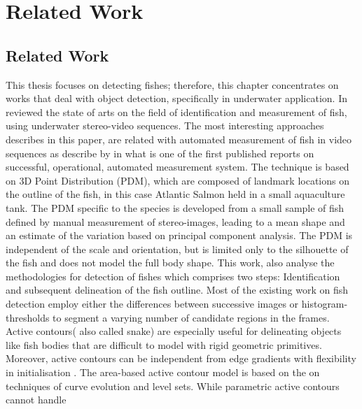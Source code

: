 \chapter{Related Work}
\label{chapter:Related Work}



 
\section{Related Work}
This thesis focuses on detecting fishes; therefore, this chapter concentrates on
works that deal with object detection, specifically in underwater application.
In \citet{Shortis2013} reviewed the state of arts on the field of identification 
and measurement of fish, using underwater stereo-video sequences. The most interesting 
approaches describes in this paper, are related with automated measurement of fish 
in video sequences as describe by \citet{Tillett2000} in what is one of the first 
published reports on successful, operational, automated measurement system. The 
technique is based on 3D Point Distribution (PDM), which are composed of landmark 
locations on the outline of the fish, in this case Atlantic Salmon held in a small 
aquaculture tank. The PDM specific to the species is developed from a small sample 
of fish defined by manual measurement of stereo-images, leading to a mean shape 
and an estimate of the variation based on principal component analysis. The PDM 
is independent of the scale and orientation, but is limited only to the silhouette 
of the fish and does not model the full body shape.
This work, also analyse the methodologies for detection of fishes which comprises
two steps: Identification and subsequent delineation of the fish outline. Most of the
existing work on fish detection employ either the differences between successive 
images \citet{Spampinato2008,Tillett2000} or histogram-thresholds to segment a 
varying number of candidate regions in the frames. Active contours( also called snake)
are especially useful for delineating objects like fish bodies that are difficult to 
model with rigid geometric primitives. Moreover, active contours can be independent 
from edge gradients with flexibility in initialisation \citet{Chan2001}. 
The area-based active contour model \citet{Chan2001} is based on the on techniques 
of curve evolution and level sets. While parametric active contours cannot handle 
